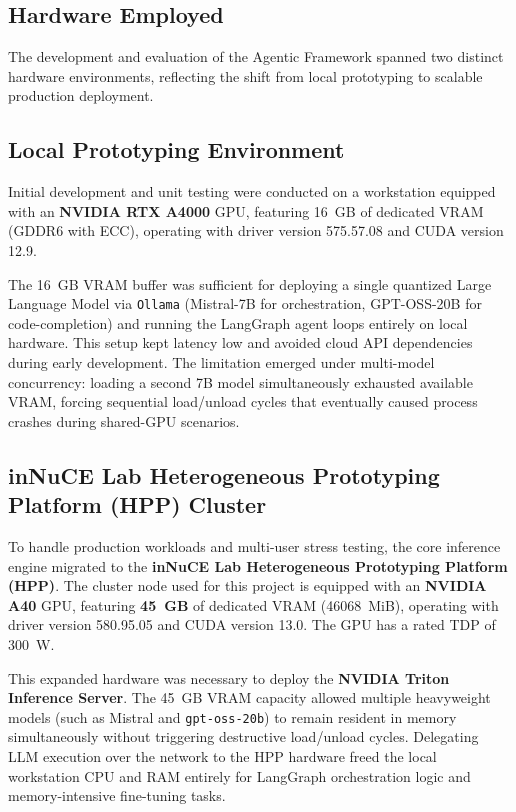 \subsection{Hardware Employed}
\label{sec:used_hardware}

The development and evaluation of the Agentic Framework spanned two distinct hardware environments, reflecting the shift from local prototyping to scalable production deployment.

\subsection{Local Prototyping Environment}
Initial development and unit testing were conducted on a workstation equipped with an \textbf{NVIDIA RTX A4000} GPU, featuring 16~GB of dedicated VRAM (GDDR6 with ECC), operating with driver version 575.57.08 and CUDA version 12.9.

The 16~GB VRAM buffer was sufficient for deploying a single quantized Large Language Model via \texttt{Ollama} (Mistral-7B for orchestration, GPT-OSS-20B for code-completion) and running the LangGraph agent loops entirely on local hardware. This setup kept latency low and avoided cloud API dependencies during early development. The limitation emerged under multi-model concurrency: loading a second 7B model simultaneously exhausted available VRAM, forcing sequential load/unload cycles that eventually caused process crashes during shared-GPU scenarios.

\subsection{inNuCE Lab Heterogeneous Prototyping Platform (HPP) Cluster}
To handle production workloads and multi-user stress testing, the core inference engine migrated to the \textbf{inNuCE Lab Heterogeneous Prototyping Platform (HPP)}. The cluster node used for this project is equipped with an \textbf{NVIDIA A40} GPU, featuring \textbf{45~GB} of dedicated VRAM (46068~MiB), operating with driver version 580.95.05 and CUDA version 13.0. The GPU has a rated TDP of 300~W.

This expanded hardware was necessary to deploy the \textbf{NVIDIA Triton Inference Server}. The 45~GB VRAM capacity allowed multiple heavyweight models (such as Mistral and \texttt{gpt-oss-20b}) to remain resident in memory simultaneously without triggering destructive load/unload cycles. Delegating LLM execution over the network to the HPP hardware freed the local workstation CPU and RAM entirely for LangGraph orchestration logic and memory-intensive fine-tuning tasks.
